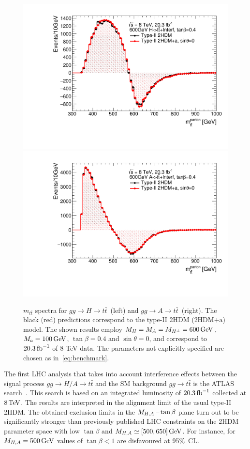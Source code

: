 \documentclass[a4paper, 11pt,notoc]{article}
\newcommand{\mA}{\ensuremath{M_{A}}\xspace}
\newcommand{\ma}{\ensuremath{M_{a}}\xspace}
\newcommand{\mH}{\ensuremath{M_{H}}\xspace}
\newcommand{\mHc}{\ensuremath{M_{H^{\pm}}}\xspace}
\newcommand{\hdma}{\ensuremath{\textrm{2HDM+a}}\xspace}
\begin{document}
\begin{figure}
\centering
\includegraphics[width=.475\textwidth]{ttres_2HDMvs2HDMa_H.pdf} \quad 
\includegraphics[width=.475\textwidth]{ttres_2HDMvs2HDMa_A.pdf}
\vspace{4mm}
\caption{$m_{t \bar t}$ spectra for $gg \to H \to t \bar t$~(left) and  $gg \to A \to t \bar t$~(right). The black (red) predictions correspond to the type-II 2HDM (\hdma) model.  The shown results employ $\mH=\mA=\mHc = 600 \, {\rm GeV}$,  $\ma=100 \, {\rm GeV}$, $\tan \beta =0.4$ and $\sin \theta = 0$, and correspond to $20.3 \, {\rm fb}^{-1}$ of 8 TeV data.  The parameters not explicitly specified are chosen as in~\eqref{eq:benchmark}.}
\label{fig:ttres_2HDMvs2HDMa}
\end{figure}

The first LHC analysis that takes into account interference effects between the signal process $gg \to H/A \to t \bar t$ and the SM background $gg \to t \bar t$ is the ATLAS search~\cite{Aaboud:2017hnm}. This search  is based on an integrated luminosity of $20.3 \, {\rm fb}^{-1}$ collected at $8 \, {\rm TeV}$. The results are interpreted in the alignment limit of the usual type-II 2HDM. The obtained  exclusion limits in the $M_{H,A}\hspace{0.5mm}$--$\hspace{0.5mm} \tan \beta$ plane turn out to be significantly stronger than previously published LHC constraints on the 2HDM parameter space with low $\tan \beta$ and $M_{H,A} \simeq [500, 650] \, {\rm GeV}$. For instance,  for $M_{H,A} = 500 \, {\rm GeV}$ values of $\tan \beta < 1$ are disfavoured at 95\%~CL. %
\end{document}
